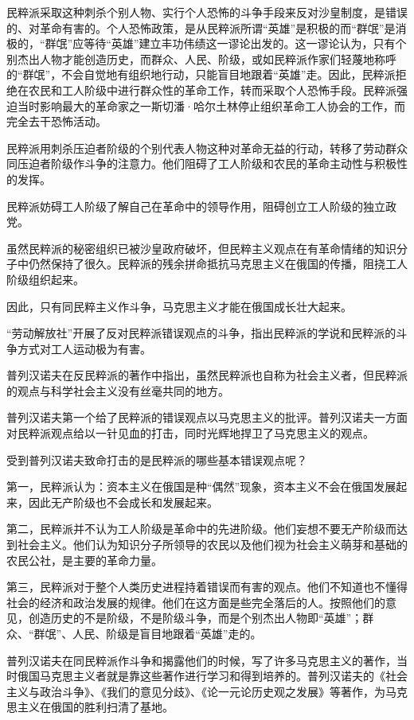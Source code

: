 民粹派采取这种刺杀个别人物、实行个人恐怖的斗争手段来反对沙皇制度，是错误的、对革命有害的。个人恐怖政策，是从民粹派所谓“英雄”是积极的而“群氓”是消极的，“群氓”应等待“英雄”建立丰功伟绩这一谬论出发的。这一谬论认为，只有个别杰出人物才能创造历史，而群众、人民、阶级，或如民粹派作家们轻蔑地称呼的“群氓”，不会自觉地有组织地行动，只能盲目地跟着“英雄”走。因此，民粹派拒绝在农民和工人阶级中进行群众性的革命工作，转而采取个人恐怖手段。民粹派强迫当时影响最大的革命家之一斯切潘·哈尔土林停止组织革命工人协会的工作，而完全去干恐怖活动。

民粹派用刺杀压迫者阶级的个别代表人物这种对革命无益的行动，转移了劳动群众同压迫者阶级作斗争的注意力。他们阻碍了工人阶级和农民的革命主动性与积极性的发挥。

民粹派妨碍工人阶级了解自己在革命中的领导作用，阻碍创立工人阶级的独立政党。

虽然民粹派的秘密组织已被沙皇政府破坏，但民粹主义观点在有革命情绪的知识分子中仍然保持了很久。民粹派的残余拼命抵抗马克思主义在俄国的传播，阻挠工人阶级组织起来。

因此，只有同民粹主义作斗争，马克思主义才能在俄国成长壮大起来。

“劳动解放社”开展了反对民粹派错误观点的斗争，指出民粹派的学说和民粹派的斗争方式对工人运动极为有害。

普列汉诺夫在反民粹派的著作中指出，虽然民粹派也自称为社会主义者，但民粹派的观点与科学社会主义没有丝毫共同的地方。

普列汉诺夫第一个给了民粹派的错误观点以马克思主义的批评。普列汉诺夫一方面对民粹派观点给以一针见血的打击，同时光辉地捍卫了马克思主义的观点。

受到普列汉诺夫致命打击的是民粹派的哪些基本错误观点呢？

第一，民粹派认为：资本主义在俄国是种“偶然”现象，资本主义不会在俄国发展起来，因此无产阶级也不会成长和发展起来。

第二，民粹派并不认为工人阶级是革命中的先进阶级。他们妄想不要无产阶级而达到社会主义。他们认为知识分子所领导的农民以及他们视为社会主义萌芽和基础的农民公社，是主要的革命力量。

第三，民粹派对于整个人类历史进程持着错误而有害的观点。他们不知道也不懂得社会的经济和政治发展的规律。他们在这方面是些完全落后的人。按照他们的意见，创造历史的不是阶级，不是阶级斗争，而是个别杰出人物即“英雄”；群众、“群氓”、人民、阶级是盲目地跟着“英雄”走的。

普列汉诺夫在同民粹派作斗争和揭露他们的时候，写了许多马克思主义的著作，当时俄国马克思主义者就是靠这些著作进行学习和得到培养的。普列汉诺夫的《社会主义与政治斗争》、《我们的意见分歧》、《论一元论历史观之发展》等著作，为马克思主义在俄国的胜利扫清了基地。

